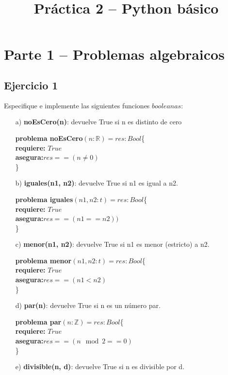 \documentclass[10pt,a4paper]{article}
\title{Práctica 2 – Python básico}
\date{}
\begin{document}
\maketitle
\section*{Parte 1 – Problemas algebraicos}


\subsection*{Ejercicio 1}

Especifique e implemente las siguientes funciones $booleanas$:
\begin{enumerate}
\item[a)]\textbf{noEsCero(n)}: devuelve True si n es distinto de cero

\textbf{problema noEsCero}$(n : \mathbb{R})=res:Bool$\{ \\
	\textbf{  requiere:} $True$\\
	\textbf{  asegura:}$res == (n\not = 0)$\\
	\}


\item[b)]\textbf{iguales(n1, n2)}: devuelve True si n1 es igual a n2.

\textbf{problema iguales}$(n1,n2 : t)=res:Bool$\{ \\
	\textbf{  requiere:} $True$\\
	\textbf{  asegura:}$res == (n1 == n2))$\\
	\}

\item[c)]\textbf{menor(n1, n2)}: devuelve True si n1 es menor (estricto) a n2.

\textbf{problema menor}$(n1,n2 : t)=res:Bool$\{ \\
	\textbf{  requiere:} $True$\\
	\textbf{  asegura:}$res == (n1<n2) $\\
	\}

\item[d)]\textbf{par(n)}: devuelve True si n es un número par.

\textbf{problema par}$(n : \mathbb{Z})=res:Bool$\{ \\
	\textbf{  requiere:} $True$\\
	\textbf{  asegura:}$res == (n \mod 2==0)$\\
	\}

\item[e)]\textbf{divisible(n, d)}: devuelve True si n es divisible por d.


\end{enumerate}
\end{document}
